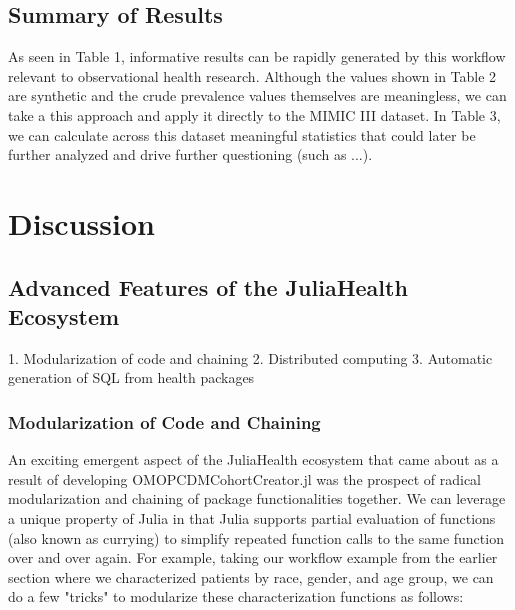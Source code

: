 \documentclass{juliacon}
\begin{document}
\subsection{Summary of Results}

As seen in Table 1, informative results can be rapidly generated by this workflow relevant to observational health research.
Although the values shown in Table 2 are synthetic and the crude prevalence values themselves are meaningless, we can take a this approach and apply it directly to the MIMIC III dataset.
In Table 3, we can calculate across this dataset meaningful statistics that could later be further analyzed and drive further questioning (such as ...).

\section{Discussion}

\subsection{Advanced Features of the JuliaHealth Ecosystem}


    1. Modularization of code and chaining
    2. Distributed computing
    3. Automatic generation of SQL from health packages

\subsubsection{Modularization of Code and Chaining}

An exciting emergent aspect of the JuliaHealth ecosystem that came about as a result of developing OMOPCDMCohortCreator.jl was the prospect of radical modularization and chaining of package functionalities together.
We can leverage a unique property of Julia in that Julia supports partial evaluation of functions (also known as currying) to simplify repeated function calls to the same function over and over again.
For example, taking our workflow example from the earlier section where we characterized patients by race, gender, and age group, we can do a few "tricks" to modularize these characterization functions as follows:
\end{document}
